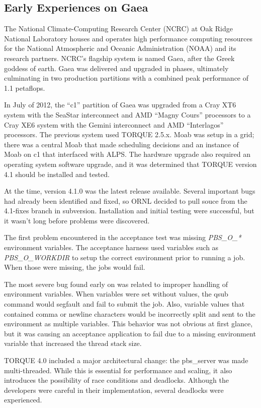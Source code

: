 \subsection{Early Experiences on Gaea}

The National Climate-Computing Research Center (NCRC) at Oak Ridge National
Laboratory houses and operates high performance computing resources for the
National Atmospheric and Oceanic Administration (NOAA) and its research
partners.  NCRC's flagship system is named Gaea, after the Greek goddess of
earth.  Gaea was delivered and upgraded in phases, ultimately culminating in
two production partitions with a combined peak performance of 1.1 petaflops.

In July of 2012, the ``c1'' partition of Gaea was upgraded from a Cray XT6
system with the SeaStar interconnect and AMD ``Magny Cours'' processors to a
Cray XE6 system with the Gemini interconnect and AMD ``Interlagos'' processors.
The previous system used TORQUE 2.5.x.  Moab was setup in a grid; there was a
central Moab that made scheduling decisions and an instance of Moab on c1 that
interfaced with ALPS.  The hardware upgrade also required an operating system
software upgrade, and it was determined that TORQUE version 4.1 should be
installed and tested.

At the time, version 4.1.0 was the latest release available.  Several important
bugs had already been identified and fixed, so ORNL decided to pull souce from
the 4.1-fixes branch in subversion.  Installation and initial testing were
successful, but it wasn't long before problems were discovered.

The first problem encountered in the acceptance test was missing \emph{PBS_O_*}
environment variables.  The acceptance harness used variables such as
\emph{PBS_O_WORKDIR} to setup the correct environment prior to running a job.
When those were missing, the jobs would fail.

The most severe bug found early on was related to improper handling of
environment variables.  When variables were set without values, the qsub
command would segfault and fail to submit the job.  Also, variable values that
contained comma or newline characters would be incorrectly split and sent to
the environment as multiple variables.  This behavior was not obvious at first
glance, but it was causing an acceptance application to fail due to a missing
environment variable that increased the thread stack size.

TORQUE 4.0 included a major architectural change: the pbs_server was made
multi-threaded.  While this is essential for performance and scaling, it also
introduces the possibility of race conditions and deadlocks.  Although the
developers were careful in their implementation, several deadlocks were
experienced.

